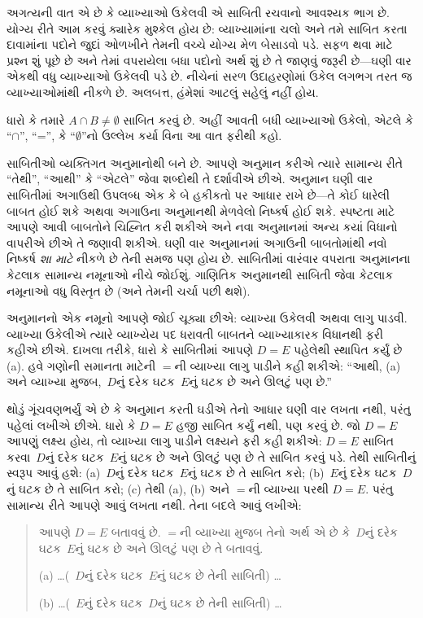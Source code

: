 અગત્યની વાત એ છે કે વ્યાખ્યાઓ ઉકેલવી એ સાબિતી રચવાનો આવશ્યક
ભાગ છે. યોગ્ય રીતે આમ કરવું ક્યારેક મુશ્કેલ હોય છે: વ્યાખ્યામાંના
ચલો અને તમે સાબિત કરતા દાવામાંના પદોને જુદાં ઓળખીને તેમની વચ્ચે
યોગ્ય મેળ બેસાડવો પડે. સફળ થવા માટે પ્રશ્ન શું પૂછે છે અને તેમાં
વપરાયેલા બધા પદોનો અર્થ શું છે તે જાણવું જરૂરી છે---ઘણી વાર
એકથી વધુ વ્યાખ્યાઓ ઉકેલવી પડે છે. નીચેનાં સરળ ઉદાહરણોમાં
ઉકેલ લગભગ તરત જ વ્યાખ્યાઓમાંથી નીકળે છે. અલબત્ત, હંમેશાં
આટલું સહેલું નહીં હોય.

\begin{prob}
ધારો કે તમારે $A \cap B \neq \emptyset$ સાબિત કરવું છે. અહીં
આવતી બધી વ્યાખ્યાઓ ઉકેલો, એટલે કે ``$\cap$'', ``='', કે
``$\emptyset$''નો ઉલ્લેખ કર્યા વિના આ વાત ફરીથી કહો.
\end{prob}
\endgroup


\begingroup
\makeatletter{}\makeatother


\label{guunit:OLP-0606}


સાબિતીઓ વ્યક્તિગત અનુમાનોથી બને છે. આપણે અનુમાન કરીએ ત્યારે
સામાન્ય રીતે ``તેથી'', ``આથી'' કે ``એટલે'' જેવા શબ્દોથી તે
દર્શાવીએ છીએ. અનુમાન ઘણી વાર સાબિતીમાં અગાઉથી ઉપલબ્ધ એક કે બે
હકીકતો પર આધાર રાખે છે---તે કોઈ ધારેલી બાબત હોઈ શકે અથવા
અગાઉના અનુમાનથી મેળવેલો નિષ્કર્ષ હોઈ શકે. સ્પષ્ટતા માટે આપણે
આવી બાબતોને ચિહ્નિત કરી શકીએ અને નવા અનુમાનમાં અન્ય કયાં વિધાનો
વાપરીએ છીએ તે જણાવી શકીએ. ઘણી વાર અનુમાનમાં અગાઉની બાબતોમાંથી
નવો નિષ્કર્ષ \emph{શા માટે} નીકળે છે તેની સમજ પણ હોય છે.
સાબિતીમાં વારંવાર વપરાતા અનુમાનના કેટલાક સામાન્ય નમૂનાઓ નીચે
જોઈશું. ગાણિતિક અનુમાનથી સાબિતી જેવા કેટલાક નમૂનાઓ વધુ વિસ્તૃત
છે (અને તેમની ચર્ચા પછી થશે).

અનુમાનનો એક નમૂનો આપણે જોઈ ચૂક્યા છીએ: વ્યાખ્યા ઉકેલવી અથવા
લાગુ પાડવી. વ્યાખ્યા ઉકેલીએ ત્યારે વ્યાખ્યેય પદ ધરાવતી બાબતને
વ્યાખ્યાકારક વિધાનથી ફરી કહીએ છીએ. દાખલા તરીકે, ધારો કે સાબિતીમાં
આપણે $D = E$ પહેલેથી સ્થાપિત કર્યું છે (a). હવે ગણોની સમાનતા
માટેની $=$ની વ્યાખ્યા લાગુ પાડીને કહી શકીએ: ``આથી, (a) અને
વ્યાખ્યા મુજબ,~$D$નું દરેક ઘટક~$E$નું ઘટક છે
અને ઊલટું પણ છે.''

થોડું ગૂંચવણભર્યું એ છે કે અનુમાન કરતી ઘડીએ તેનો આધાર ઘણી વાર
લખતા નથી, પરંતુ પહેલાં લખીએ છીએ. ધારો કે $D = E$ હજી સાબિત
કર્યું નથી, પણ કરવું છે. જો $D = E$ આપણું લક્ષ્ય હોય, તો
વ્યાખ્યા લાગુ પાડીને લક્ષ્યને ફરી કહી શકીએ: $D = E$ સાબિત
કરવા~$D$નું દરેક ઘટક~$E$નું ઘટક છે અને
ઊલટું પણ છે તે સાબિત કરવું પડે. તેથી સાબિતીનું સ્વરૂપ આવું હશે:
(a)~$D$નું દરેક ઘટક~$E$નું ઘટક છે તે સાબિત
કરો; (b)~$E$નું દરેક ઘટક~$D$નું ઘટક છે તે
સાબિત કરો; (c) તેથી (a), (b) અને $=$ની વ્યાખ્યા પરથી $D = E$.
પરંતુ સામાન્ય રીતે આપણે આવું લખતા નથી. તેના બદલે આવું લખીએ:
\begin{quote}
આપણે $D = E$ બતાવવું છે. $=$ની વ્યાખ્યા મુજબ તેનો અર્થ
એ છે કે~$D$નું દરેક ઘટક~$E$નું ઘટક છે અને
ઊલટું પણ છે તે બતાવવું.

(a) \dots (~$D$નું દરેક ઘટક~$E$નું ઘટક છે
તેની સાબિતી) \dots

(b) \dots (~$E$નું દરેક ઘટક~$D$નું ઘટક છે
તેની સાબિતી) \dots
\end{quote}

